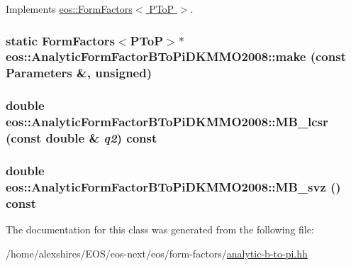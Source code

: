 Implements \hyperlink{classeos_1_1FormFactors_3_01PToP_01_4_ae753d67d42936bd32b043838e7fb769a}{eos::FormFactors$<$ PToP $>$}.\hypertarget{classeos_1_1AnalyticFormFactorBToPiDKMMO2008_aff2cc738d3c04dee5e593ef6e40d84e3}{
\subsubsection[{make}]{\setlength{\rightskip}{0pt plus 5cm}static FormFactors$<${\bf PToP}$>$$\ast$ eos::AnalyticFormFactorBToPiDKMMO2008::make (const {\bf Parameters} \&, \/  unsigned)}}
\label{classeos_1_1AnalyticFormFactorBToPiDKMMO2008_aff2cc738d3c04dee5e593ef6e40d84e3}
\hypertarget{classeos_1_1AnalyticFormFactorBToPiDKMMO2008_abc228c8f704b43ac2c777ab48d22c08c}{
\subsubsection[{MB\_\-lcsr}]{\setlength{\rightskip}{0pt plus 5cm}double eos::AnalyticFormFactorBToPiDKMMO2008::MB\_\-lcsr (const double \& {\em q2}) const}}
\label{classeos_1_1AnalyticFormFactorBToPiDKMMO2008_abc228c8f704b43ac2c777ab48d22c08c}
\hypertarget{classeos_1_1AnalyticFormFactorBToPiDKMMO2008_a813b78c9a4e5ea82d7f77154e7dffa63}{
\subsubsection[{MB\_\-svz}]{\setlength{\rightskip}{0pt plus 5cm}double eos::AnalyticFormFactorBToPiDKMMO2008::MB\_\-svz () const}}
\label{classeos_1_1AnalyticFormFactorBToPiDKMMO2008_a813b78c9a4e5ea82d7f77154e7dffa63}


The documentation for this class was generated from the following file:\begin{DoxyCompactItemize}
\item 
/home/alexshires/EOS/eos-\/next/eos/form-\/factors/\hyperlink{analytic-b-to-pi_8hh}{analytic-\/b-\/to-\/pi.hh}\end{DoxyCompactItemize}
